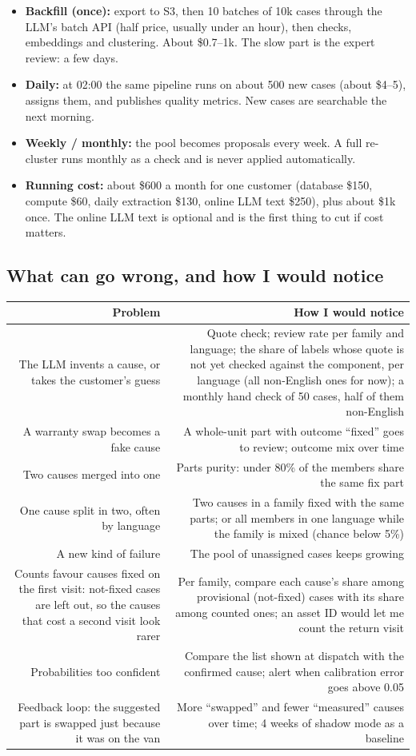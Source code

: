 \documentclass[11pt,a4paper]{article}
\begin{document}
\begin{itemize}
  \item \textbf{Backfill (once):} export to S3, then 10 batches of 10k cases through the LLM's batch API (half price, usually under an hour), then checks, embeddings and clustering. About \$0.7--1k. The slow part is the expert review: a few days.
  \item \textbf{Daily:} at 02:00 the same pipeline runs on about 500 new cases (about \$4--5), assigns them, and publishes quality metrics. New cases are searchable the next morning.
  \item \textbf{Weekly / monthly:} the pool becomes proposals every week. A full re-cluster runs monthly as a check and is never applied automatically.
  \item \textbf{Running cost:} about \$600 a month for one customer (database \$150, compute \$60, daily extraction \$130, online LLM text \$250), plus about \$1k once. The online LLM text is optional and is the first thing to cut if cost matters.
\end{itemize}

\subsection{What can go wrong, and how I would notice}\label{sec:failures}

{\small
\begin{longtable}{@{}R{0pt}{2} R{0pt}{2}@{}}
\toprule
Problem & How I would notice \\
\midrule
\endhead
\bottomrule
\endfoot
The LLM invents a cause, or takes the customer's guess & Quote check; review rate per family and language; the share of labels whose quote is not yet checked against the component, per language (all non-English ones for now); a monthly hand check of 50 cases, half of them non-English \\
A warranty swap becomes a fake cause & A whole-unit part with outcome “fixed” goes to review; outcome mix over time \\
Two causes merged into one & Parts purity: under 80\% of the members share the same fix part \\
One cause split in two, often by language & Two causes in a family fixed with the same parts; or all members in one language while the family is mixed (chance below 5\%) \\
A new kind of failure & The pool of unassigned cases keeps growing \\
Counts favour causes fixed on the first visit: not-fixed cases are left out, so the causes that cost a second visit look rarer & Per family, compare each cause's share among provisional (not-fixed) cases with its share among counted ones; an asset ID would let me count the return visit \\
Probabilities too confident & Compare the list shown at dispatch with the confirmed cause; alert when calibration error goes above 0.05 \\
Feedback loop: the suggested part is swapped just because it was on the van & More “swapped” and fewer “measured” causes over time; 4 weeks of shadow mode as a baseline \\
\end{longtable}
}
\end{document}
